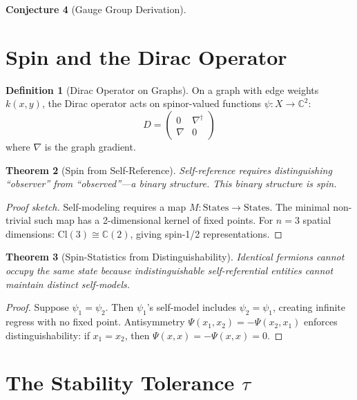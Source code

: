 \documentclass[11pt,a4paper]{article}
\theoremstyle{plain}
\newtheorem{theorem}{Theorem}[section]
\theoremstyle{definition}
\newtheorem{definition}[theorem]{Definition}
\newtheorem{conjecture}[theorem]{Conjecture}
\theoremstyle{remark}
\begin{document}
\begin{conjecture}[Gauge Group Derivation]
\section{Spin and the Dirac Operator}

\begin{definition}[Dirac Operator on Graphs]
On a graph with edge weights $k(x,y)$, the Dirac operator acts on spinor-valued functions $\psi: X \to \mathbb{C}^2$:
\begin{equation}
D = \begin{pmatrix} 0 & \nabla^\dagger \\ \nabla & 0 \end{pmatrix}
\end{equation}
where $\nabla$ is the graph gradient.
\end{definition}

\begin{theorem}[Spin from Self-Reference]
Self-reference requires distinguishing ``observer'' from ``observed''---a binary structure. This binary structure \emph{is} spin.
\end{theorem}

\begin{proof}[Proof sketch]
Self-modeling requires a map $M: \text{States} \to \text{States}$. The minimal non-trivial such map has a 2-dimensional kernel of fixed points. For $n=3$ spatial dimensions: $\text{Cl}(3) \cong \mathbb{C}(2)$, giving spin-1/2 representations.
\end{proof}

\begin{theorem}[Spin-Statistics from Distinguishability]
Identical fermions cannot occupy the same state because indistinguishable self-referential entities cannot maintain distinct self-models.
\end{theorem}

\begin{proof}
Suppose $\psi_1 = \psi_2$. Then $\psi_1$'s self-model includes $\psi_2 = \psi_1$, creating infinite regress with no fixed point. Antisymmetry $\Psi(x_1, x_2) = -\Psi(x_2, x_1)$ enforces distinguishability: if $x_1 = x_2$, then $\Psi(x,x) = -\Psi(x,x) = 0$.
\end{proof}

\section{The Stability Tolerance $\tau$}


\end{conjecture}
\end{document}
